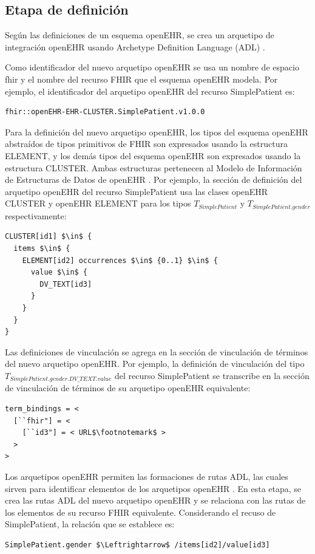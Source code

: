 \subsection{Etapa de definición}

Según las definiciones de un esquema openEHR, se crea un arquetipo de integración openEHR usando Archetype Definition Language (ADL) \cite{openEHRADL}.

Como identificador del nuevo arquetipo openEHR se usa un nombre de espacio fhir y el nombre del recurso FHIR que el esquema openEHR modela. Por ejemplo, el identificador del arquetipo openEHR del recurso SimplePatient es:

\begin{lstlisting}
fhir::openEHR-EHR-CLUSTER.SimplePatient.v1.0.0
\end{lstlisting}

Para la definición del nuevo arquetipo openEHR, los tipos del esquema openEHR abstraídos de tipos primitivos de FHIR son expresados usando la estructura ELEMENT, y los demás tipos del esquema openEHR son expresados usando la estructura CLUSTER. Ambas estructuras pertenecen al Modelo de Información de Estructuras de Datos de openEHR \cite{openEHRDataStructures}. Por ejemplo, la sección de definición del arquetipo openEHR del recurso SimplePatient usa las clases openEHR CLUSTER y openEHR ELEMENT para los tipos \(T_{SimplePatient}\) y \(T_{SimplePatient.gender}\) respectivamente:

\begin{lstlisting}[mathescape=true]
CLUSTER[id1] $\in$ {
  items $\in$ {
    ELEMENT[id2] occurrences $\in$ {0..1} $\in$ {
      value $\in$ {
        DV_TEXT[id3]
      }
    }
  }
}
\end{lstlisting}

Las definiciones de vinculación se agrega en la sección de vinculación de términos del nuevo arquetipo openEHR. Por ejemplo, la definición de vinculación del tipo \(T_{SimplePatient.gender.DV\_TEXT.value}\) del recurso SimplePatient se transcribe en la sección de vinculación de términos de su arquetipo openEHR equivalente:

\begin{lstlisting}[escapechar=$]
term_bindings = <
  [``fhir"] = <
    [``id3"] = < URL$\footnotemark$ >
  >
>
\end{lstlisting}


Los arquetipos openEHR permiten las formaciones de rutas ADL, las cuales sirven para identificar elementos de los arquetipos openEHR \cite{openEHRArchitecture}. En esta etapa, se crea las rutas ADL del nuevo arquetipo openEHR y se relaciona con las rutas de los elementos de su recurso FHIR equivalente. Considerando el recuso de SimplePatient, la relación que se establece es:

\begin{lstlisting}[mathescape=true]
SimplePatient.gender $\Leftrightarrow$ /items[id2]/value[id3]
\end{lstlisting}
